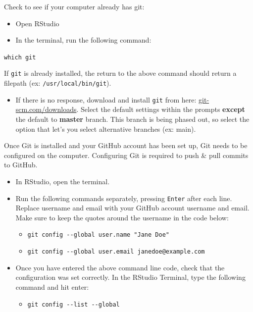 \documentclass[
]{book}
\providecommand{\tightlist}{%
  \setlength{\itemsep}{0pt}\setlength{\parskip}{0pt}}
\begin{document}
Check to see if your computer already has git:

\begin{itemize}
\tightlist
\item
  Open RStudio
\item
  In the terminal, run the following command:
\end{itemize}

\texttt{which\ git}

If \texttt{git} is already installed, the return to the above command should return a filepath (ex: \texttt{/usr/local/bin/git}).

\begin{itemize}
\tightlist
\item
  If there is no response, download and install \texttt{git} from here: \href{https://git-scm.com/downloads}{git-scm.com/downloads}. Select the default settings within the prompts \textbf{except} the default to \textbf{master} branch. This branch is being phased out, so select the option that let's you select alternative branches (ex: main).
\end{itemize}

Once Git is installed and your GitHub account has been set up, Git needs to be configured on the computer. Configuring Git is required to push \& pull commits to GitHub.

\begin{itemize}
\item
  In RStudio, open the terminal.
\item
  Run the following commands separately, pressing \texttt{Enter} after each line. Replace username and email with your GitHub account username and email. Make sure to keep the quotes around the username in the code below:

  \begin{itemize}
  \tightlist
  \item
    \texttt{git\ config\ -\/-global\ user.name\ "Jane\ Doe"}
  \item
    \texttt{git\ config\ -\/-global\ user.email\ janedoe@example.com}
  \end{itemize}
\item
  Once you have entered the above command line code, check that the configuration was set correctly. In the RStudio Terminal, type the following command and hit enter:

  \begin{itemize}
  \tightlist
  \item
    \texttt{git\ config\ -\/-list\ -\/-global}
  \end{itemize}
\end{itemize}
\end{document}
